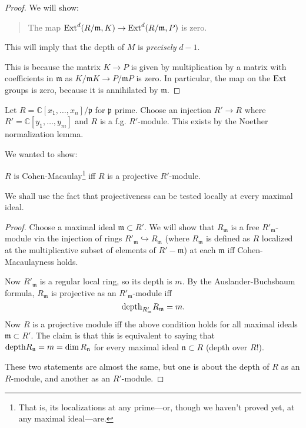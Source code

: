 \begin{proof}
We will show:
\begin{quote}
The map $\mathrm{Ext}^d(R/\mathfrak{m}, K) \to \mathrm{Ext}^{d}(R/\mathfrak{m}, P)$ is zero.
\end{quote}
This will imply that the depth of $M$ is \emph{precisely} $d-1$.

This is because the matrix $K \to P$ is given by multiplication by a matrix
with coefficients in $\mathfrak{m}$ as $K/\mathfrak{m}K \to P/\mathfrak{m}P$
is zero.  In particular, the map on the $\mathrm{Ext}$ groups is zero, because it is
annihilated by $\mathfrak{m}$.
\end{proof} 

\begin{example} 
Let $R = \mathbb{C}[x_1, \dots, x_n]/\mathfrak{p}$ for $\mathfrak{p}$ prime.
Choose an injection $R' \to R$ where $R' = \mathbb{C}[y_1, \dots, y_m]$ and
$R$ is a f.g. $R'$-module. This exists by the Noether normalization lemma. 

We wanted to show:

\begin{theorem} 
$R$ is Cohen-Macaulay\footnote{That is, its localizations at any prime---or,
though we haven't proved yet, at any maximal ideal---are.} iff $R$ is a
projective $R'$-module.
\end{theorem} 

We shall use the fact that projectiveness can be tested locally at every
maximal ideal.

\begin{proof} 
Choose a maximal ideal $\mathfrak{m} \subset R'$. We will show that
$R_{\mathfrak{m}}$ is a free $R'_{\mathfrak{m}}$-module via the injection of
rings $R'_{\mathfrak{m}} \hookrightarrow R_{\mathfrak{m}}$ (where
$R_{\mathfrak{m}}$ is defined as $R$ localized at the multiplicative subset
of elements of $R' - \mathfrak{m}$) at each $\mathfrak{m}$ iff
Cohen-Macaulayness holds.

Now $R'_{\mathfrak{m}}$ is a regular local ring, so its depth is $m$. By the
Auslander-Buchsbaum formula, $R_{\mathfrak{m}}$ is projective as an
$R'_{\mathfrak{m}}$-module iff 
\[ \mathrm{depth}_{R'_{\mathfrak{m}}} R_{\mathfrak{m}} = m.  \]
Now $R$ is a projective module iff the above condition holds for all maximal
ideals $\mathfrak{m} \subset R'$. The claim is that this is equivalent to
saying that $\mathrm{depth} R_{\mathfrak{n}} = m = \dim R_{\mathfrak{n}}$
for every maximal ideal $\mathfrak{n} \subset R$ (depth over $R$!).

These two statements are almost the same, but one is about the depth of $R$ as
an $R$-module, and another as an $R'$-module. 


\end{proof}
\end{example}
